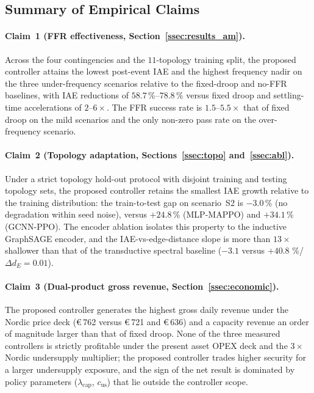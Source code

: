 \subsection{Summary of Empirical Claims}
\label{ssec:summary}

\paragraph{Claim~1 (FFR effectiveness,
Section~\ref{ssec:results_am}).}
Across the four contingencies and the $11$-topology training split,
the proposed controller attains the lowest post-event IAE and the
highest frequency nadir on the three under-frequency scenarios
relative to the fixed-droop and no-FFR baselines, with IAE
reductions of $58.7$\,\%--$78.8$\,\% versus fixed droop and
settling-time accelerations of $2$--$6\times$. The FFR success rate
is $1.5$--$5.5\times$ that of fixed droop on the mild scenarios and
the only non-zero pass rate on the over-frequency scenario.

\paragraph{Claim~2 (Topology adaptation,
Sections~\ref{ssec:topo} and~\ref{ssec:abl}).}
Under a strict topology hold-out protocol with disjoint training and
testing topology sets, the proposed controller retains the smallest
IAE growth relative to the training distribution: the train-to-test
gap on scenario~S2 is $-3.0$\,\% (no degradation within seed noise),
versus $+24.8$\,\% (MLP-MAPPO) and $+34.1$\,\% (GCNN-PPO). The
encoder ablation isolates this property to the inductive GraphSAGE
encoder, and the IAE-vs-edge-distance slope is more than $13\times$
shallower than that of the transductive spectral baseline
($-3.1$ versus $+40.8$ \%/$\Delta d_E\!=\!0.01$).

\paragraph{Claim~3 (Dual-product gross revenue,
Section~\ref{ssec:economic}).}
The proposed controller generates the highest gross daily revenue
under the Nordic price deck (\euro\,762 versus \euro\,721 and
\euro\,636) and a capacity revenue an order of magnitude larger than
that of fixed droop. None of the three measured controllers is
strictly profitable under the present asset OPEX deck and the
$3\times$ Nordic undersupply multiplier; the proposed controller
trades higher security for a larger undersupply exposure, and the
sign of the net result is dominated by policy parameters
($\lambda_{\mathrm{cap}}$, $c_{\mathrm{us}}$) that lie outside the
controller scope.

